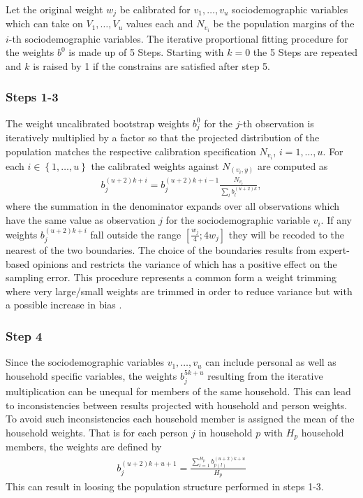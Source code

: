 \documentclass{scrartcl}
\begin{document}
Let the original weight $w_{j}$ be calibrated for $v_1,\ldots,v_u$ sociodemographic variables which can take on $V_1,\ldots,V_u$ values each and $N_{v_i}$ be the population margins of the $i$-th sociodemographic variables. The iterative proportional fitting procedure for the weights $b^{0}$ is made up of 5 Steps. Starting with $k=0$ the 5 Steps are repeated and $k$ is raised by 1 if the constrains are satisfied after step 5.

\subsubsection{Steps 1-3}
The weight uncalibrated bootstrap weights $b_j^{0}$ for the $j$-th observation is iteratively multiplied by a factor so that the projected distribution of the population matches the respective calibration specification $N_{v_i}$, $i=1,\ldots,u$.
For each $i \in \left\{1,\ldots,u\right\}$ the calibrated weights against $N_{(v_i,y)}$ are computed as
\begin{align*}
  b_j^{(u+2)k+i} = b_j^{(u+2)k+i-1}\frac{N_{v_i}}{\sum\limits_l b_l^{(u+2)k}},
\end{align*}
where the summation in the denominator expands over all observations which have the same value as observation $j$ for the sociodemographic variable $v_i$.
If any weights $b_j^{(u+2)k+i}$ fall outside the range $[\frac{w_j}{4};4w_j]$ they will be recoded to the nearest of the two boundaries. The choice of the boundaries results from expert-based opinions and restricts the variance of which has a positive effect on the sampling error. This procedure represents a common form a weight trimming where very large/small weights are trimmed in order to reduce variance but with a possible increase in bias \citep{potter90,potter93}.

\subsubsection{Step 4}
Since the sociodemographic variables $v_1,\ldots,v_u$ can include personal as well as household specific variables, the weights $b_j^{5k+u}$   resulting from the iterative multiplication can be unequal for members of the same household. This can lead to inconsistencies between results projected with household and person weights. To avoid such inconsistencies each household member is assigned the mean of the household weights. That is for each person $j$ in household $p$ with $H_p$ household members, the weights are defined by
\begin{align*}
  b_j^{(u+2)k+u+1} = \frac{\sum\limits_{l=1}^{H_p}b_{p(l)}^{(u+2)k+u}}{H_p}
\end{align*}
This can result in loosing the population structure performed in steps 1-3.
\end{document}
